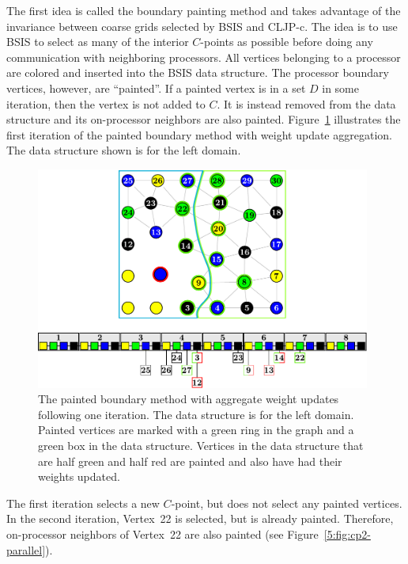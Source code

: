 \documentclass{elsart}
\begin{document}
The first idea is called the boundary painting method and takes
advantage of the invariance between coarse grids selected by BSIS and
CLJP-c. The idea is to use BSIS to select as many of the interior
$C$-points as possible before doing any communication with neighboring
processors. All vertices belonging to a processor are colored and
inserted into the BSIS data structure. The processor boundary
vertices, however, are ``painted''. If a painted vertex is in a set
$D$ in some iteration, then the vertex is not added to $C$. It is
instead removed from the data structure and its on-processor neighbors
are also painted. Figure~\ref{5:fig:cp1-parallel} illustrates the
first iteration of the painted boundary method with weight update
aggregation. The data structure shown is for the left domain.
\begin{figure}
  \begin{center}
    \includegraphics[width=0.98\textwidth]{images/BSIS/cp1p}
    \caption{The painted boundary method with aggregate weight
    updates following one iteration. The data structure is for the
    left domain. Painted vertices are marked with a green ring in the
    graph and a green box in the data structure. Vertices in the data
    structure that are half green and half red are painted and also
    have had their weights updated.}
    \label{5:fig:cp1-parallel}
  \end{center}
\end{figure}
The first iteration selects a new $C$-point, but does not select any
painted vertices. In the second iteration, Vertex~22 is selected, but
is already painted. Therefore, on-processor neighbors of Vertex~22 are
also painted (see Figure~\ref{5:fig:cp2-parallel}).
\end{document}
